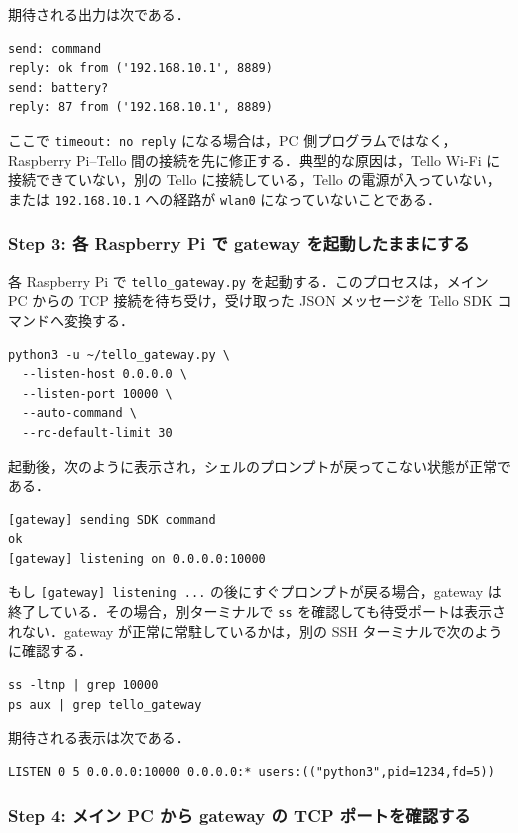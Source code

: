期待される出力は次である．

\begin{lstlisting}
send: command
reply: ok from ('192.168.10.1', 8889)
send: battery?
reply: 87 from ('192.168.10.1', 8889)
\end{lstlisting}

ここで \texttt{timeout: no reply} になる場合は，PC 側プログラムではなく，Raspberry Pi--Tello 間の接続を先に修正する．典型的な原因は，Tello Wi-Fi に接続できていない，別の Tello に接続している，Tello の電源が入っていない，または \texttt{192.168.10.1} への経路が \texttt{wlan0} になっていないことである．

\subsubsection{Step 3: 各 Raspberry Pi で gateway を起動したままにする}

各 Raspberry Pi で \texttt{tello\_gateway.py} を起動する．このプロセスは，メイン PC からの TCP 接続を待ち受け，受け取った JSON メッセージを Tello SDK コマンドへ変換する．

\begin{lstlisting}
python3 -u ~/tello_gateway.py \
  --listen-host 0.0.0.0 \
  --listen-port 10000 \
  --auto-command \
  --rc-default-limit 30
\end{lstlisting}

起動後，次のように表示され，シェルのプロンプトが戻ってこない状態が正常である．

\begin{lstlisting}
[gateway] sending SDK command
ok
[gateway] listening on 0.0.0.0:10000
\end{lstlisting}

もし \texttt{[gateway] listening ...} の後にすぐプロンプトが戻る場合，gateway は終了している．その場合，別ターミナルで \texttt{ss} を確認しても待受ポートは表示されない．gateway が正常に常駐しているかは，別の SSH ターミナルで次のように確認する．

\begin{lstlisting}
ss -ltnp | grep 10000
ps aux | grep tello_gateway
\end{lstlisting}

期待される表示は次である．

\begin{lstlisting}
LISTEN 0 5 0.0.0.0:10000 0.0.0.0:* users:(("python3",pid=1234,fd=5))
\end{lstlisting}

\subsubsection{Step 4: メイン PC から gateway の TCP ポートを確認する}

